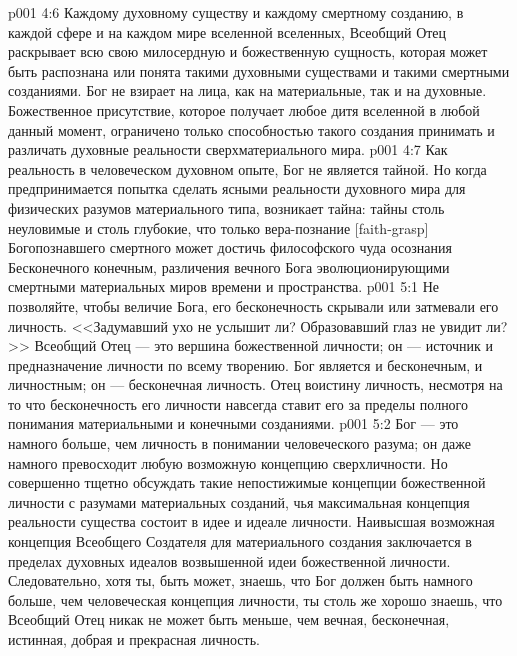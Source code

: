 \vs p001 4:6 Каждому духовному существу и каждому смертному созданию, в каждой сфере и на каждом мире вселенной вселенных, Всеобщий Отец раскрывает всю свою милосердную и божественную сущность, которая может быть распознана или понята такими духовными существами и такими смертными созданиями. Бог не взирает на лица, как на материальные, так и на духовные. Божественное присутствие, которое получает любое дитя вселенной в любой данный момент, ограничено только способностью такого создания принимать и различать духовные реальности сверхматериального мира.
\vs p001 4:7 Как реальность в человеческом духовном опыте, Бог не является тайной. Но когда предпринимается попытка сделать ясными реальности духовного мира для физических разумов материального типа, возникает тайна: тайны столь неуловимые и столь глубокие, что только вера\hyp{}познание [faith\hyp{}grasp] Богопознавшего смертного может достичь философского чуда осознания Бесконечного конечным, различения вечного Бога эволюционирующими смертными материальных миров времени и пространства.
\vs p001 5:1 Не позволяйте, чтобы величие Бога, его бесконечность скрывали или затмевали его личность. <<Задумавший ухо не услышит ли? Образовавший глаз не увидит ли?>> Всеобщий Отец --- это вершина божественной личности; он --- источник и предназначение личности по всему творению. Бог является и бесконечным, и личностным; он --- бесконечная личность. Отец воистину личность, несмотря на то что бесконечность его личности навсегда ставит его за пределы полного понимания материальными и конечными созданиями.
\vs p001 5:2 Бог --- это намного больше, чем личность в понимании человеческого разума; он даже намного превосходит любую возможную концепцию сверхличности. Но совершенно тщетно обсуждать такие непостижимые концепции божественной личности с разумами материальных созданий, чья максимальная концепция реальности существа состоит в идее и идеале личности. Наивысшая возможная концепция Всеобщего Создателя для материального создания заключается в пределах духовных идеалов возвышенной идеи божественной личности. Следовательно, хотя ты, быть может, знаешь, что Бог должен быть намного больше, чем человеческая концепция личности, ты столь же хорошо знаешь, что Всеобщий Отец никак не может быть меньше, чем вечная, бесконечная, истинная, добрая и прекрасная личность.
